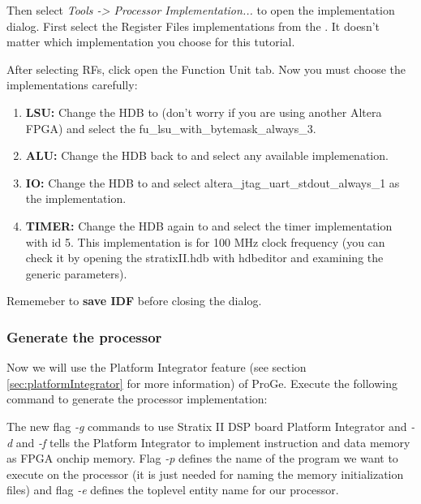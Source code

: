 \documentclass[a4paper,twoside]{tceusermanual}
\begin{document}

Then select \textit{Tools -> Processor Implementation...} to open the
implementation dialog. First select the Register Files implementations
from the . It doesn't matter which
implementation you choose for this tutorial.

After selecting RFs, click open the Function Unit tab. Now you must
choose the implementations carefully:

\begin{enumerate}
\item%
\textbf{LSU:} Change the HDB to  (don't worry if you are
using another Altera FPGA) and select the
fu\_lsu\_with\_bytemask\_always\_3.

\item%
\textbf{ALU:} Change the HDB back to  and
select any available implemenation.

\item%
\textbf{IO:} Change the HDB to  and select
altera\_jtag\_uart\_stdout\_always\_1 as the implementation.

\item%
\textbf{TIMER:} Change the HDB again to  and select
the timer implementation with id 5. This implementation is for 100 MHz
clock frequency (you can check it by opening the stratixII.hdb with
hdbeditor and examining the generic parameters).
\end{enumerate}

Rememeber to \textbf{save IDF} before closing the dialog.


\subsubsection{Generate the processor}
\label{tut:fpga_stdout_gen_proc}

Now we will use the Platform Integrator feature (see section
\ref{sec:platformIntegrator} for more information) of ProGe. Execute
the following command to generate the processor implementation:


The new flag \textit{-g} commands to use Stratix II DSP board Platform
Integrator and \textit{-d} and \textit{-f} tells the Platform
Integrator to implement instruction and data memory as FPGA onchip
memory. Flag \textit{-p} defines the name of the program we want to
execute on the processor (it is just needed for naming the memory
initialization files) and flag \textit{-e} defines the toplevel entity
name for our processor.
\end{document}
